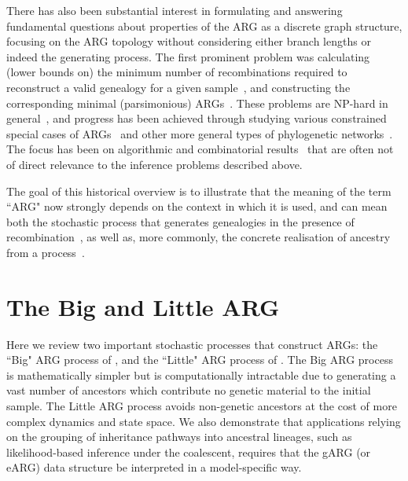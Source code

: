 \documentclass{article}
\begin{document}
There has also been substantial interest in formulating and answering
fundamental questions about properties
of the ARG as a discrete graph structure, focusing on the ARG topology without considering
either branch lengths or indeed the generating process.
The first prominent problem was calculating (lower bounds on) the minimum number of
recombinations required to reconstruct a valid genealogy for a given
sample~\citep{myers2003bounds}, and constructing the corresponding
minimal (parsimonious)
ARGs~\citep{song2003parsimonious,song2005efficient,lyngso2005minimum}.
These problems are NP-hard in general~\citep{wang2001perfect}, and progress has
been achieved through studying various constrained special cases of ARGs~\citep[e.g.][]{gusfield2004optimal} and
other more general types of phylogenetic networks~\citep{huson2010phylogenetic}. The
focus has been on algorithmic and combinatorial results~\citep{gusfield2014recombinatorics}
that are often not of
direct relevance to the inference problems described above.


The goal of this historical overview is to illustrate that the meaning of the term ``ARG" now strongly
depends on the context in which it is used, and can mean both the
stochastic process that generates genealogies in the presence of
recombination~\citep[e.g.][]{nordborg2000linkage,birkner2013ancestral,
wilton2015smc,griffiths2016coalescent},
as well as, more commonly, the concrete realisation of ancestry from a
process~\citep[e.g.][]{gusfield2014recombinatorics,mathieson2020ancestry,brandt2021evaluation}.

\section{The Big and Little ARG}
\label{sec-big-and-little-arg}
Here we review two important stochastic processes that construct ARGs:
the ``Big" ARG process of \cite{griffiths1997ancestral}, and the ``Little" ARG process of
 \cite{hudson1983properties}. The Big ARG process is mathematically simpler
 but is computationally intractable due to generating a vast number of ancestors
 which contribute no genetic material to the initial sample.
The Little ARG process avoids non-genetic ancestors at the cost of more complex
dynamics and state space. We also demonstrate that applications relying on the grouping of inheritance pathways into ancestral lineages, such as likelihood-based inference under the coalescent, requires that the
gARG (or eARG) data structure be interpreted in a model-specific way.
\end{document}
